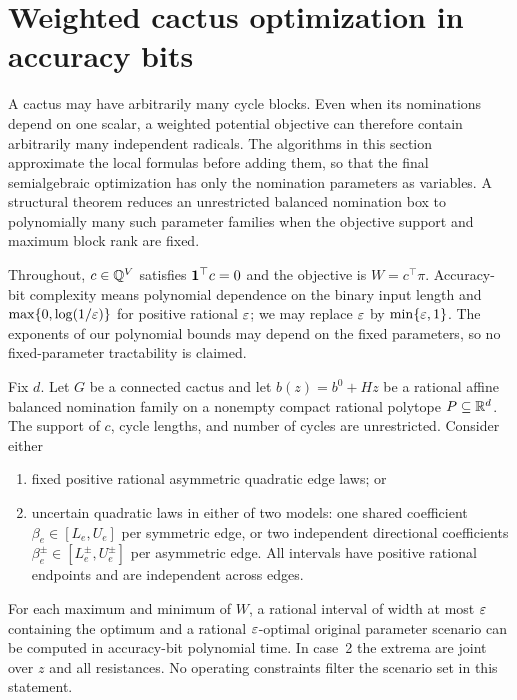 \section{Weighted cactus optimization in accuracy bits}
\label{sec:a-weighted-cactus}
\label{sec:a-open-problems}

A cactus may have arbitrarily many cycle blocks. Even when its nominations
depend on one scalar, a weighted potential objective can therefore contain
arbitrarily many independent radicals. The algorithms in this section
approximate the local formulas before adding them, so that the final
semialgebraic optimization has only the nomination parameters as variables.
A structural theorem reduces an unrestricted balanced nomination box
to polynomially many such parameter families when the objective support
and maximum block rank are fixed.

Throughout, $c\in\mathbb{Q}^V$ satisfies $\mathbf{1}^\top c=0$ and the objective is
$W=c^\top\pi$. Accuracy-bit complexity means polynomial dependence on the
binary input length and $\max\{0,\log(1/\varepsilon)\}$ for positive rational
$\varepsilon$; we may replace $\varepsilon$ by $\min\{\varepsilon,1\}$. The exponents of our
polynomial bounds may depend on the fixed parameters, so no
fixed-parameter tractability is claimed.

\begin{theorem}
\label{thm:a-wcac-affine}
Fix $d$. Let $G$ be a connected cactus and let
$b(z)=b^0+Hz$ be a rational affine balanced nomination family on a nonempty
compact rational polytope $P\subseteq\mathbb{R}^d$. The support of $c$, cycle
lengths, and number of cycles are unrestricted. Consider either
\begin{enumerate}
\item fixed positive rational asymmetric quadratic edge laws; or
\item uncertain quadratic laws in either of two models: one shared
coefficient $\beta_e\in[L_e,U_e]$ per symmetric edge, or two independent
directional coefficients $\beta_e^\pm\in[L_e^\pm,U_e^\pm]$ per asymmetric
edge. All intervals have positive rational endpoints and are independent
across edges.
\end{enumerate}
For each maximum and minimum of $W$, a rational interval of width at most
$\varepsilon$ containing the optimum and a rational $\varepsilon$-optimal original
parameter scenario can be computed in accuracy-bit polynomial time.
In case~2 the extrema are joint over $z$ and all resistances. No operating
constraints filter the scenario set in this statement.
\end{theorem}

